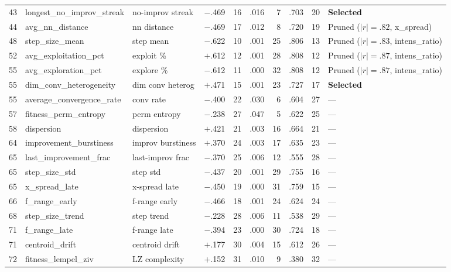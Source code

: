 \begin{table}[p]
\begin{tabular}{@{}rllrrrrrrl@{}}
43 & longest\_no\_improv\_streak   & no-improv streak & $-$.469 & 16 & .016 &  7 & .703 & 20 & \textbf{Selected} \\
44 & avg\_nn\_distance             & nn distance & $-$.469 & 17 & .012 &  8 & .720 & 19 & Pruned ($|r|{=}.82$, x\_spread) \\
48 & step\_size\_mean              & step mean & $-$.622 & 10 & .001 & 25 & .806 & 13 & Pruned ($|r|{=}.83$, intens\_ratio) \\
52 & avg\_exploitation\_pct        & exploit \% & $+$.612 & 12 & .001 & 28 & .808 & 12 & Pruned ($|r|{=}.87$, intens\_ratio) \\
55 & avg\_exploration\_pct         & explore \% & $-$.612 & 11 & .000 & 32 & .808 & 12 & Pruned ($|r|{=}.87$, intens\_ratio) \\
55 & dim\_conv\_heterogeneity      & dim conv heterog & $+$.471 & 15 & .001 & 23 & .727 & 17 & \textbf{Selected} \\
\midrule
55 & average\_convergence\_rate    & conv rate & $-$.400 & 22 & .030 &  6 & .604 & 27 & --- \\
57 & fitness\_perm\_entropy        & perm entropy & $-$.238 & 27 & .047 &  5 & .622 & 25 & --- \\
58 & dispersion                    & dispersion & $+$.421 & 21 & .003 & 16 & .664 & 21 & --- \\
64 & improvement\_burstiness       & improv burstiness & $+$.370 & 24 & .003 & 17 & .635 & 23 & --- \\
65 & last\_improvement\_frac       & last-improv frac & $-$.370 & 25 & .006 & 12 & .555 & 28 & --- \\
65 & step\_size\_std               & step std & $-$.437 & 20 & .001 & 29 & .755 & 16 & --- \\
65 & x\_spread\_late               & x-spread late & $-$.450 & 19 & .000 & 31 & .759 & 15 & --- \\
66 & f\_range\_early               & f-range early & $-$.466 & 18 & .001 & 24 & .624 & 24 & --- \\
68 & step\_size\_trend             & step trend & $-$.228 & 28 & .006 & 11 & .538 & 29 & --- \\
71 & f\_range\_late                & f-range late & $-$.394 & 23 & .000 & 30 & .724 & 18 & --- \\
71 & centroid\_drift               & centroid drift & $+$.177 & 30 & .004 & 15 & .612 & 26 & --- \\
72 & fitness\_lempel\_ziv          & LZ complexity & $+$.152 & 31 & .010 &  9 & .380 & 32 & --- \\

\end{tabular}
\end{table}
